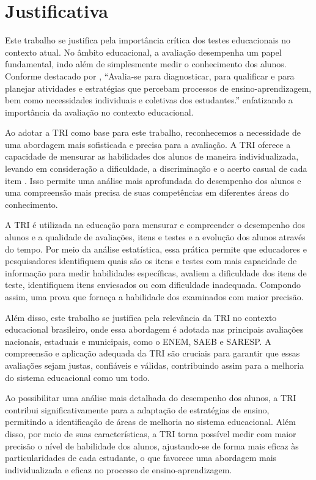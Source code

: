 \section{Justificativa}

Este trabalho se justifica pela importância crítica dos testes educacionais no contexto atual. No âmbito educacional, a avaliação desempenha um papel fundamental, indo além de simplesmente medir o conhecimento dos alunos. Conforme destacado por \cite{silva2019}, ``Avalia-se para diagnosticar, para qualificar e para planejar atividades e estratégias que percebam processos de ensino-aprendizagem, bem como necessidades individuais e coletivas dos estudantes.'' enfatizando a importância da avaliação no contexto educacional.

Ao adotar a TRI como base para este trabalho, reconhecemos a necessidade de uma abordagem mais sofisticada e precisa para a avaliação. A TRI oferece a capacidade de mensurar as habilidades dos alunos de maneira individualizada, levando em consideração a dificuldade, a discriminação e o acerto casual de cada item \cite{pasquali2018}. Isso permite uma análise mais aprofundada do desempenho dos alunos e uma compreensão mais precisa de suas competências em diferentes áreas do conhecimento.

A TRI é utilizada na educação para mensurar e compreender o desempenho dos alunos e a qualidade de avaliações, itens e testes e a evolução dos alunos através do tempo. Por meio da análise estatística, essa prática permite que educadores e pesquisadores identifiquem quais são os itens e testes com mais capacidade de informação para medir habilidades específicas, avaliem a dificuldade dos itens de teste, identifiquem itens enviesados ou com dificuldade inadequada. Compondo assim, uma prova que forneça a habilidade dos examinados com maior precisão.

Além disso, este trabalho se justifica pela relevância da TRI no contexto educacional brasileiro, onde essa abordagem é adotada nas principais avaliações nacionais, estaduais e municipais, como o ENEM, SAEB e SARESP. A compreensão e aplicação adequada da TRI são cruciais para garantir que essas avaliações sejam justas, confiáveis e válidas, contribuindo assim para a melhoria do sistema educacional como um todo.

Ao possibilitar uma análise mais detalhada do desempenho dos alunos, a TRI contribui significativamente para a adaptação de estratégias de ensino, permitindo a identificação de áreas de melhoria no sistema educacional. Além disso, por meio de suas características, a TRI torna possível medir com maior precisão o nível de habilidade dos alunos, ajustando-se de forma mais eficaz às particularidades de cada estudante, o que favorece uma abordagem mais individualizada e eficaz no processo de ensino-aprendizagem.



